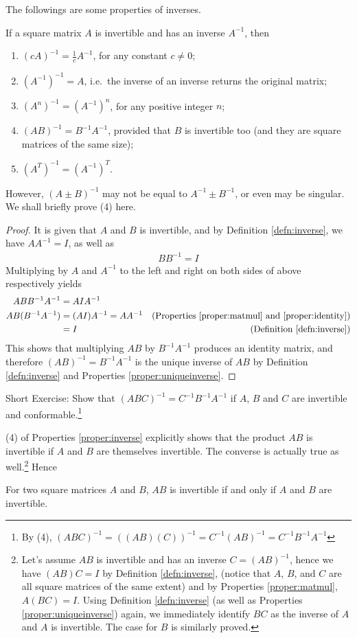 The followings are some properties of inverses.
\begin{proper}
\label{proper:inverse}
If a square matrix $A$ is invertible and has an inverse $A^{-1}$, then
\begin{enumerate}
\item $(cA)^{-1} = \frac{1}{c}A^{-1}$, for any constant $c \neq 0$;
\item $(A^{-1})^{-1} = A$, i.e.\ the inverse of an inverse returns the original matrix;
\item $(A^n)^{-1} = (A^{-1})^n$, for any positive integer $n$;
\item $(AB)^{-1} = B^{-1}A^{-1}$, provided that $B$ is invertible too (and they are square matrices of the same size);
\item $(A^T)^{-1} = (A^{-1})^T$.
\end{enumerate}
\end{proper}
However, $(A\pm B)^{-1}$ may not be equal to $A^{-1} \pm B^{-1}$, or even may be singular. We shall briefly prove (4) here.
\begin{proof}
It is given that $A$ and $B$ is invertible, and by Definition \ref{defn:inverse}, we have $AA^{-1} = I$, as well as 
\begin{align*}
BB^{-1} = I    
\end{align*}
Multiplying by $A$ and $A^{-1}$ to the left and right on both sides of above respectively yields
\begin{align*}
ABB^{-1}A^{-1} &= AIA^{-1} \\
AB(B^{-1}A^{-1}) &= (AI)A^{-1} = AA^{-1} & \text{(Properties \ref{proper:matmul} and \ref{proper:identity})} \\
&= I & \text{(Definition \ref{defn:inverse})}
\end{align*}
This shows that multiplying $AB$ by $B^{-1}A^{-1}$ produces an identity matrix, and therefore $(AB)^{-1} = B^{-1}A^{-1}$ is the unique inverse of $AB$ by Definition \ref{defn:inverse} and Properties \ref{proper:uniqueinverse}.
\end{proof}
Short Exercise: Show that $(ABC)^{-1} = C^{-1}B^{-1}A^{-1}$ if $A$, $B$ and $C$ are invertible and conformable.\footnote{By (4), $(ABC)^{-1} = ((AB)(C))^{-1} = C^{-1}(AB)^{-1} = C^{-1}B^{-1}A^{-1}$}\par
(4) of Properties \ref{proper:inverse} explicitly shows that the product $AB$ is invertible if $A$ and $B$ are themselves invertible. The converse is actually true as well.\footnote{Let's assume $AB$ is invertible and has an inverse $C = (AB)^{-1}$, hence we have $(AB)C = I$ by Definition \ref{defn:inverse}, (notice that $A$, $B$, and $C$ are all square matrices of the same extent) and by Properties \ref{proper:matmul}, $A(BC) = I$. Using Definition \ref{defn:inverse} (as well as Properties \ref{proper:uniqueinverse}) again, we immediately identify $BC$ as the inverse of $A$ and $A$ is invertible. The case for $B$ is similarly proved.} Hence
\begin{proper}
\label{proper:ABinv}
For two square matrices $A$ and $B$, $AB$ is invertible if and only if $A$ and $B$ are invertible.
\end{proper}

